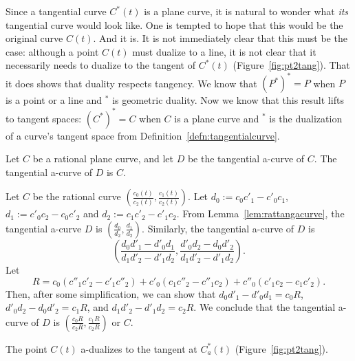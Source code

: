 \documentclass[12pt]{article}
\begin{document}
Since a tangential curve $C^*(t)$ is a plane curve,
it is natural to wonder what {\em its} tangential curve would look like.
One is tempted to hope that this would be the original curve $C(t)$.
And it is.
It is not immediately clear that this must be the case: 
although a point $C(t)$ must dualize to a line, 
it is not clear that it necessarily needs to dualize to the tangent of $C^*(t)$ (Figure~\ref{fig:pt2tang}).
That it does shows that duality respects tangency.
We know that $(P^*)^* = P$ when $P$ is a point or a line and $^*$ is geometric duality.
Now we know that this result lifts to tangent spaces: 
$(C^*)^* = C$ when $C$ is a plane curve 
and $^*$ is the dualization of a curve's tangent space from Definition~\ref{defn:tangentialcurve}.

\begin{lemma}
Let $C$ be a rational plane curve, and
let $D$ be the tangential a-curve of $C$.
The tangential a-curve of $D$ is $C$.
\end{lemma}
\prf
Let $C$ be the rational curve $(\frac{c_0(t)}{c_2(t)},\frac{c_1(t)}{c_2(t)})$.
Let $d_0 := c_0c'_1 - c'_0c_1$, $d_1 := c'_0c_2 - c_0c'_2$
and $d_2 := c_1c'_2 - c'_1c_2$.
From Lemma~\ref{lem:rattangacurve}, 
the tangential a-curve $D$ is $(\frac{d_0}{d_2}, \frac{d_1}{d_2})$.
Similarly, the tangential a-curve of $D$ is 
\[
	(\frac{d_0 d'_1 - d'_0 d_1}{d_1 d'_2 - d'_1 d_2},
	 \frac{d'_0 d_2 - d_0 d'_2}{d_1 d'_2 - d'_1 d_2}).
\]
Let 
\begin{equation}
\label{eq:R}
	R = c_0(c''_1c'_2 - c'_1c''_2) + c'_0(c_1c''_2 - c''_1c_2) + c''_0(c'_1c_2 - c_1c'_2).
\end{equation}
Then, after some simplification, we can show that 
$d_0d'_1 - d'_0d_1 = c_0R$,
$d'_0 d_2 - d_0 d'_2 = c_1R$, and
$d_1 d'_2 - d'_1 d_2 = c_2R$.
We conclude that the tangential a-curve of $D$ is $(\frac{c_0R}{c_2R},\frac{c_1R}{c_2R})$
or $C$.
\QED

\begin{corollary}
The point $C(t)$ a-dualizes to the tangent at $C_a^*(t)$ (Figure~\ref{fig:pt2tang}).
\end{corollary}

\end{document}
